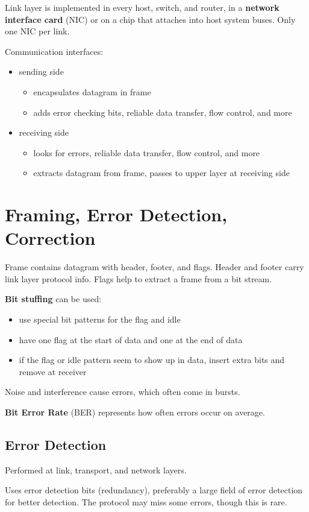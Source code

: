 \documentclass[11pt]{article}
\begin{document}
Link layer is implemented in every host, switch, and router, in a \textbf{network interface card} (NIC) or
on a chip that attaches into host system buses.
Only one NIC per link.

Communication interfaces:
\begin{itemize}
\item sending side
\begin{itemize}
\item encapsulates datagram in frame
\item adds error checking bits, reliable data transfer, flow control, and more
\end{itemize}
\item receiving side
\begin{itemize}
\item looks for errors, reliable data transfer, flow control, and more
\item extracts datagram from frame, passes to upper layer at receiving side
\end{itemize}
\end{itemize}
\section{Framing, Error Detection, Correction}
\label{sec:orgb8a48e2}
Frame contains datagram with header, footer, and flags.
Header and footer carry link layer protocol info.
Flags help to extract a frame from a bit stream.

\textbf{Bit stuffing} can be used:
\begin{itemize}
\item use special bit patterns for the flag and idle
\item have one flag at the start of data and one at the end of data
\item if the flag or idle pattern seem to show up in data, insert extra bits and remove at receiver
\end{itemize}

Noise and interference cause errors, which often come in bursts.

\textbf{Bit Error Rate} (BER) represents how often errors occur on average.
\subsection{Error Detection}
\label{sec:org0ee07dd}
Performed at link, transport, and network layers.

Uses error detection bits (redundancy), preferably a large field of error detection for better detection.
The protocol may miss some errors, though this is rare.
\end{document}
